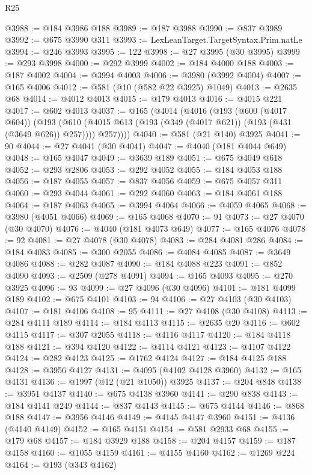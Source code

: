 \begin{lexlean}{R25}
\begin{coremodule}
@3988 := @184 @3986 @188
@3989 := @187 @3988
@3990 := @837 @3989
@3992 := @675 @3990 @311
@3993 := LexLeanTarget.TargetSyntax.Prim.natLe
@3994 := @246 @3993
@3995 := 122
@3998 := @27 @3995 (@30 @3995)
@3999 := @293 @3998
@4000 := @292 @3999
@4002 := @184 @4000 @188
@4003 := @187 @4002
@4004 := @3994 @4003
@4006 := @3980 (@3992 @4004)
@4007 := @165 @4006
@4012 := @581 (@10 (@582 @22 @3925) @1049)
@4013 := @2635 @68
@4014 := @4012 @4013
@4015 := @179 @4013
@4016 := @4015 @221
@4017 := @602 @4013
@4037 := @165
    (@4014
      (@4016
        (@193
          (@600 (@4017 @604))
          (@193
            (@610 (@4015 @613 (@193 (@349 (@4017 @621)) (@193 (@431 (@3649 @626)) @257))))
            @257))))
@4040 := @581 (@21 @140) @3925
@4041 := 90
@4044 := @27 @4041 (@30 @4041)
@4047 := @4040 (@181 @4044 @649)
@4048 := @165 @4047
@4049 := @3639 @189
@4051 := @675 @4049 @618
@4052 := @293 @2806
@4053 := @292 @4052
@4055 := @184 @4053 @188
@4056 := @187 @4055
@4057 := @837 @4056
@4059 := @675 @4057 @311
@4060 := @293 @4044
@4061 := @292 @4060
@4063 := @184 @4061 @188
@4064 := @187 @4063
@4065 := @3994 @4064
@4066 := @4059 @4065
@4068 := @3980 (@4051 @4066)
@4069 := @165 @4068
@4070 := 91
@4073 := @27 @4070 (@30 @4070)
@4076 := @4040 (@181 @4073 @649)
@4077 := @165 @4076
@4078 := 92
@4081 := @27 @4078 (@30 @4078)
@4083 := @284 @4081 @286
@4084 := @184 @4083
@4085 := @300 @2055
@4086 := @4084 @4085
@4087 := @3649 @4086
@4088 := @282 @4087
@4090 := @184 @4088 @223
@4091 := @852 @4090
@4093 := @2509 (@278 @4091)
@4094 := @165 @4093
@4095 := @270 @3925
@4096 := 93
@4099 := @27 @4096 (@30 @4096)
@4101 := @181 @4099 @189
@4102 := @675 @4101
@4103 := 94
@4106 := @27 @4103 (@30 @4103)
@4107 := @181 @4106
@4108 := 95
@4111 := @27 @4108 (@30 @4108)
@4113 := @284 @4111 @189
@4114 := @184 @4113
@4115 := @2635 @20
@4116 := @602 @4115
@4117 := @307 @2055
@4118 := @4116 @4117
@4120 := @184 @4118 @188
@4121 := @394 @4120
@4122 := @4114 @4121
@4123 := @4107 @4122
@4124 := @282 @4123
@4125 := @1762 @4124
@4127 := @184 @4125 @188
@4128 := @3956 @4127
@4131 := @4095 (@4102 @4128 @3960)
@4132 := @165 @4131
@4136 := @1997 (@12 (@21 @1050)) @3925
@4137 := @204 @848
@4138 := @3951 @4137
@4140 := @675 @4138 @3960
@4141 := @290 @838
@4143 := @184 @4141 @249
@4144 := @837 @4143
@4145 := @675 @4144
@4146 := @868 @188
@4147 := @3956 @4146
@4149 := @4145 @4147 @3960
@4151 := @4136 (@4140 @4149)
@4152 := @165 @4151
@4154 := @581 @2933 @68
@4155 := @179 @68
@4157 := @184 @3929 @188
@4158 := @204 @4157
@4159 := @187 @4158
@4160 := @1055 @4159
@4161 := @4155 @4160
@4162 := @1269 @224
@4164 := @193 (@343 @4162)

\end{coremodule}
\end{lexlean}

